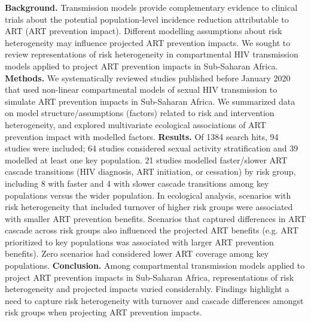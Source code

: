 \textbf{Background.}
Transmission models provide complementary evidence to clinical trials about
the potential population-level incidence reduction attributable to ART (ART prevention impact).
Different modelling assumptions about risk heterogeneity may influence projected ART prevention impacts.
We sought to review representations of risk heterogeneity in compartmental HIV transmission models
applied to project ART prevention impacts in Sub-Saharan Africa.
\textbf{Methods.}
We systematically reviewed studies published before January 2020 that used
non-linear compartmental models of sexual HIV transmission
to simulate ART prevention impacts in Sub-Saharan Africa.
We summarized data on model structure/assumptions (factors) related to risk and intervention heterogeneity,
and explored multivariate ecological associations of ART prevention impact with modelled factors.
\textbf{Results.}
Of 1384 search hits, 94 studies were included;
64 studies considered sexual activity stratification and 39 modelled at least one key population.
21 studies modelled faster/slower ART cascade transitions (HIV diagnosis, ART initiation, or cessation) by risk group,
including 8 with faster and 4 with slower cascade transitions among key populations versus the wider population.
In ecological analysis, scenarios with risk heterogeneity that included turnover of higher risk groups
were associated with smaller ART prevention benefits. Scenarios that captured differences in ART cascade across risk groups also influenced the projected ART benefits (e.g. 
ART prioritized to key populations was associated with larger ART prevention benefits). %
Zero scenarios had considered lower ART coverage among key populations. %
\textbf{Conclusion.}
Among compartmental transmission models applied to project ART prevention impacts in Sub-Saharan Africa,
representations of risk heterogeneity and projected impacts varied considerably. Findings highlight a need to 
capture risk heterogeneity with turnover and 
cascade differences amongst risk groups when projecting ART prevention impacts.